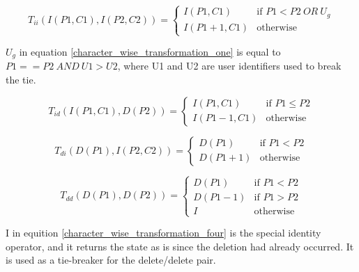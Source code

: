 \documentclass[12pt]{article}
\begin{document}
  \small

  \begin{equation} \label{character_wise_transformation_one}
    T_{ii}(I(P1, C1), I(P2, C2)) =
    \left\{
	    \begin{array}{ll}
		    I(P1, C1) & \mbox{if } P1 < P2\ OR\ U_{g} \\
		    I(P1+1, C1) & \mbox{otherwise }
	    \end{array}
    \right.
  \end{equation}

  \(U_{g}\) in equation \ref{character_wise_transformation_one} is equal to \(P1 == P2 \ AND\ U1 > U2 \),
  where U1 and U2 are user identifiers used to break the tie.

  \begin{equation} \label{character_wise_transformation_two}
    T_{id}(I(P1, C1), D(P2)) =
    \left\{
	    \begin{array}{ll}
		    I(P1, C1) & \mbox{if } P1 \leq P2 \\
		    I(P1-1, C1) & \mbox{otherwise}
	    \end{array}
    \right.
  \end{equation}

  \begin{equation} \label{character_wise_transformation_three}
    T_{di}(D(P1), I(P2, C2)) =
    \left\{
	    \begin{array}{ll}
		    D(P1) & \mbox{if } P1 < P2 \\
		    D(P1+1) & \mbox{otherwise}
	    \end{array}
    \right.
  \end{equation}

  \begin{equation} \label{character_wise_transformation_four}
    T_{dd}(D(P1), D(P2)) =
    \left\{
	    \begin{array}{ll}
		    D(P1) & \mbox{if } P1 < P2 \\
		    D(P1-1) & \mbox{if } P1 > P2 \\
        I & \mbox{otherwise }
	    \end{array}
    \right.
  \end{equation}

  \normalfont

  I in equition \ref{character_wise_transformation_four} is the special identity operator,
  and it returns the state as is since the deletion had already occurred. It is used as a tie-breaker for the delete/delete pair.
  
\end{document}
